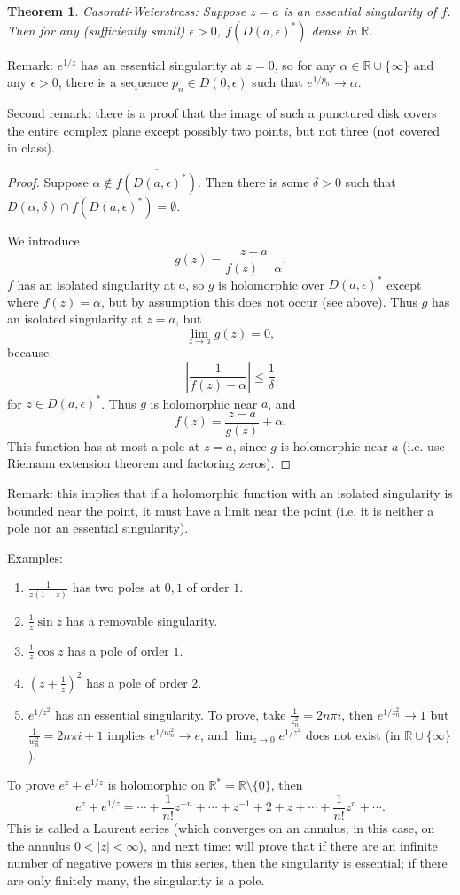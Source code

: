 \documentclass{artikel3}
\newcommand{\pr}[1]{\left(#1\right)}
\newcommand{\abs}[1]{\left|#1\right|}
\newcommand{\complex}{\mathbb{R}}
\newtheorem{thm}{Theorem}
\numberwithin{equation}{enumi}
\begin{document}
\begin{thm}
	Casorati-Weierstrass: Suppose $z=a$ is an essential singularity
	of $f$.  Then for any (sufficiently small) $\epsilon>0$, $f(D(a,\epsilon)^*)$
	dense in $\complex$.
\end{thm}
Remark: $e^{1/z}$ has an essential singularity at $z=0$, so for any $\alpha\in \complex\cup\{\infty\}$
and any $\epsilon>0$,
there is a sequence $p_n\in D(0,\epsilon)$ such that $e^{1/p_n}\to \alpha$.

Second remark: there is a proof that the image
of such a punctured disk covers the entire complex
plane except possibly two points, but not three (not covered in class).

\begin{proof}
	Suppose $\alpha\notin \overline{f(D(a,\epsilon)^*)}$.  Then
	there is some $\delta>0$ such that $D(\alpha,\delta)\cap f(D(a,\epsilon)^*)=\emptyset$.
	
	We introduce \[
		g(z)=\frac{z-a}{f(z)-\alpha}.
	\] $f$ has an isolated singularity at $a$, so $g$ is holomorphic
	over $D(a,\epsilon)^*$ except where $f(z)=\alpha$, but by assumption
	this does not occur (see above).  Thus $g$ has an isolated
	singularity at $z=a$, but \[
		\lim_{z\to a}g(z)=0,
	\] because \[
		\abs{\frac{1}{f(z)-\alpha}}\leq\frac{1}{\delta}
	\] for $z\in D(a,\epsilon)^*$.  Thus $g$ is holomorphic near $a$, and \[
		f(z)=\frac{z-a}{g(z)}+\alpha.
	\] This function has at most a pole at $z=a$, since $g$ is holomorphic
	near $a$ (i.e. use Riemann extension theorem and factoring zeros).
\end{proof}

Remark: this implies that if a holomorphic function with an isolated
singularity is bounded near the point, it must have a limit
near the point (i.e. it is neither a pole nor an essential singularity).

Examples:
\begin{enumerate}
	\item
		$\frac{1}{z(1-z)}$ has two poles at $0,1$ of order $1$.
	\item
		$\frac{1}{z}\sin z$ has a removable singularity.
	\item
		$\frac{1}{z}\cos z$ has a pole of order $1$.
	\item
		$\pr{z+\frac{1}{z}}^2$ has a pole of order $2$.
	\item
		$e^{1/z^2}$ has an essential singularity.  To prove,
		take $\frac{1}{z_n^2}=2n\pi i$, then $e^{1/z_n^2}\to 1$
		but $\frac{1}{w_n^2}=2n\pi i+1$ implies $e^{1/w_n^2}\to e$,
		and $\lim_{z\to 0}e^{1/z^2}$ does not exist (in $\complex\cup\{\infty\}$).
\end{enumerate}

To prove $e^z+e^{1/z}$ is holomorphic on $\complex^*=\complex\setminus\{0\}$, then \[
	e^z+e^{1/z}=\cdots+\frac{1}{n!}z^{-n}+\cdots+z^{-1}+2+z+\cdots+\frac{1}{n!}z^n+\cdots.
\] This is called a Laurent series (which converges on an annulus; in this case,
on the annulus $0<\abs{z}<\infty$), and next time: will prove that if there are an infinite
number of negative powers in this series, then the singularity is essential; if there
are only finitely many, the singularity is a pole.
\label{lastpage}
\end{document}

